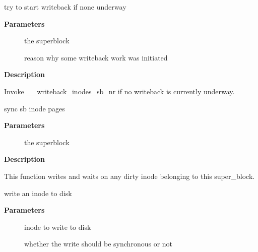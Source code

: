 \documentclass[a4paper,8pt,english]{sphinxmanual}
\begin{document}
\begin{fulllineitems}
\label{filesystems/index:c.try_to_writeback_inodes_sb}
try to start writeback if none underway

\end{fulllineitems}


\textbf{Parameters}
\begin{description}
\item[{}] \leavevmode
the superblock

\item[{}] \leavevmode
reason why some writeback work was initiated

\end{description}

\textbf{Description}

Invoke \_\_writeback\_inodes\_sb\_nr if no writeback is currently underway.

\begin{fulllineitems}
\label{filesystems/index:c.sync_inodes_sb}
sync sb inode pages

\end{fulllineitems}


\textbf{Parameters}
\begin{description}
\item[{}] \leavevmode
the superblock

\end{description}

\textbf{Description}

This function writes and waits on any dirty inode belonging to this
super\_block.

\begin{fulllineitems}
\label{filesystems/index:c.write_inode_now}
write an inode to disk

\end{fulllineitems}


\textbf{Parameters}
\begin{description}
\item[{}] \leavevmode
inode to write to disk

\item[{}] \leavevmode
whether the write should be synchronous or not

\end{description}
\end{document}
